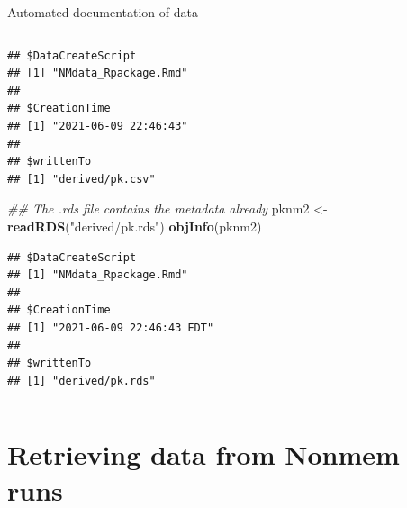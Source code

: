 \documentclass[
  8pt,
  ignorenonframetext,
  aspectratio=169]{beamer}
\newenvironment{Shaded}{\begin{snugshade}}{\end{snugshade}}
\newcommand{\CommentTok}[1]{\textcolor[rgb]{0.56,0.35,0.01}{\textit{#1}}}
\newcommand{\KeywordTok}[1]{\textcolor[rgb]{0.13,0.29,0.53}{\textbf{#1}}}
\newcommand{\NormalTok}[1]{#1}
\newcommand{\StringTok}[1]{\textcolor[rgb]{0.31,0.60,0.02}{#1}}
\begin{document}
\begin{frame}[fragile]{Automated documentation of data}
\begin{columns}[T]
\begin{column}{0.48\textwidth}
\begin{verbatim}
## $DataCreateScript
## [1] "NMdata_Rpackage.Rmd"
## 
## $CreationTime
## [1] "2021-06-09 22:46:43"
## 
## $writtenTo
## [1] "derived/pk.csv"
\end{verbatim}

\begin{Shaded}
\begin{Highlighting}[]
\CommentTok{\#\# The .rds file contains the metadata already}
\NormalTok{pknm2 \textless{}{-}}\StringTok{ }\KeywordTok{readRDS}\NormalTok{(}\StringTok{"derived/pk.rds"}\NormalTok{)}
\KeywordTok{objInfo}\NormalTok{(pknm2)}
\end{Highlighting}
\end{Shaded}

\begin{verbatim}
## $DataCreateScript
## [1] "NMdata_Rpackage.Rmd"
## 
## $CreationTime
## [1] "2021-06-09 22:46:43 EDT"
## 
## $writtenTo
## [1] "derived/pk.rds"
\end{verbatim}
\end{column}
\end{columns}

\normalsize
\end{frame}

\hypertarget{retrieving-data-from-nonmem-runs}{%
\section{Retrieving data from Nonmem
runs}\label{retrieving-data-from-nonmem-runs}}
\end{document}

